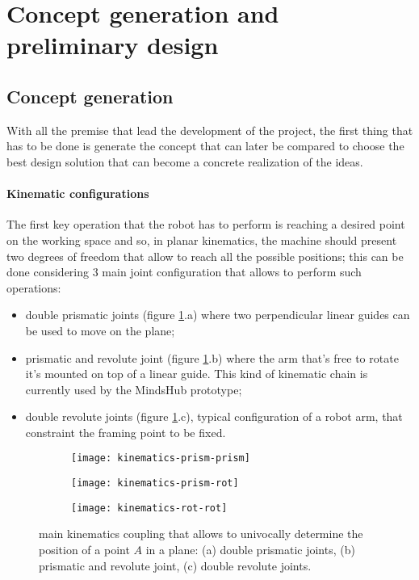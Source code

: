 \section{Concept generation and preliminary design}
\subsection{Concept generation}
	With all the premise that lead the development of the project, the first thing that has to be done is generate the concept that can later be compared to choose the best design solution that can become a concrete realization of the ideas.
	
	\paragraph{Kinematic configurations} The first key operation that the robot has to perform is reaching a desired point on the working space and so, in planar kinematics, the machine should present two degrees of freedom that allow to reach all the possible positions; this can be done considering 3 main joint configuration that allows to perform such operations:
	\begin{itemize}
		\item double prismatic joints (figure \ref{fig:kinematiccoupling}.a) where two perpendicular linear guides can be used to move on the plane;
		\item prismatic and revolute joint (figure \ref{fig:kinematiccoupling}.b) where the arm that's free to rotate it's mounted on top of a linear guide. This kind of kinematic chain is currently used by the MindsHub prototype;
		\item double revolute joints (figure \ref{fig:kinematiccoupling}.c), typical configuration of a robot arm, that constraint the framing point to be fixed.
	\end{itemize}
	
	\begin{figure}[bht]
	\centering
		\begin{subfigure}{0.32\linewidth}
			\centering \texttt{[image: kinematics-prism-prism]}
			\caption{}
		\end{subfigure}
		\begin{subfigure}{0.32\linewidth}
			\centering \texttt{[image: kinematics-prism-rot]}
			\caption{}
		\end{subfigure}
		\begin{subfigure}{0.32\linewidth}
			\centering \texttt{[image: kinematics-rot-rot]}
			\caption{}
		\end{subfigure}
		\caption{main kinematics coupling that allows to univocally determine the position of a point $A$ in a plane: (a) double prismatic joints, (b) prismatic and revolute joint, (c) double revolute joints.}
		\label{fig:kinematiccoupling}
	\end{figure}
	
